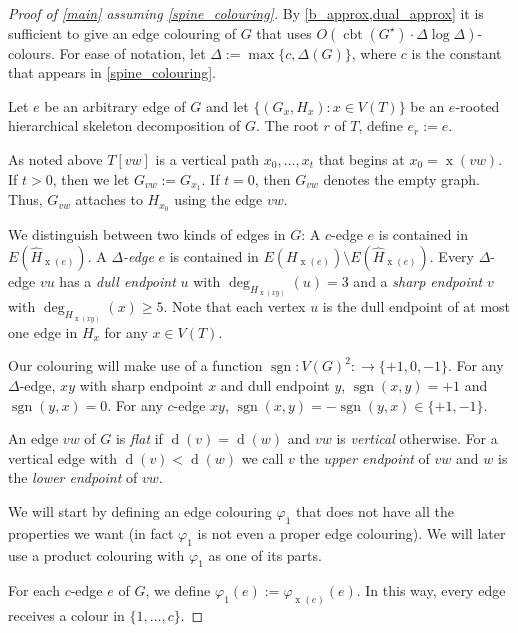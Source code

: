 \documentclass[kpfonts]{patmorin}
\DeclareMathOperator{\x}{x}
\DeclareMathOperator{\depth}{d}
\DeclareMathOperator{\cbt}{cbt}
\DeclareMathOperator{\sgn}{sgn}
\begin{document}
\begin{proof}[Proof of \cref{main} assuming \cref{spine_colouring}]
    By \cref{b_approx,dual_approx} it is sufficient to give an edge colouring of $G$ that uses $O(\cbt(G^\star)\cdot\Delta\log\Delta)$-colours.  For ease of notation, let $\Delta:=\max\{c,\Delta(G)\}$, where $c$ is the constant that appears in \cref{spine_colouring}.

    Let $e$ be an arbitrary edge of $G$ and let
    $\{(G_x,H_x): x\in V(T)\}$ be an $e$-rooted hierarchical skeleton decomposition of $G$.  The root $r$ of $T$, define $e_r:=e$.


    As noted above $T[vw]$ is a vertical path $x_0,\ldots,x_t$ that begins at $x_0=\x(vw)$.  If $t>0$, then we let $G_{vw}:=G_{x_1}$.  If $t=0$, then $G_{vw}$ denotes the empty graph.  Thus, $G_{vw}$ attaches to $H_{x_0}$ using the edge $vw$.

    We distinguish between two kinds of edges in $G$: A $c$-edge $e$ is contained in $E(\hat{H}_{\x(e)})$.  A \emph{$\Delta$-edge} $e$ is contained in $E(H_{\x(e)})\setminus E(\hat{H}_{\x(e)})$.  Every $\Delta$-edge $vu$ has a \emph{dull endpoint} $u$ with $\deg_{H_{\x(xy)}}(u)=3$ and a \emph{sharp endpoint} $v$ with $\deg_{H_{\x(xy)}}(x)\ge 5$.  Note that each vertex $u$ is the dull endpoint of at most one edge in $H_x$ for any $x\in V(T)$.

    Our colouring will make use of a function $\sgn:V(G)^2:\to\{+1,0,-1\}$.  For any $\Delta$-edge, $xy$ with sharp endpoint $x$ and dull endpoint $y$, $\sgn(x,y)={+1}$ and $\sgn(y,x)=0$.  For any $c$-edge $xy$, $\sgn(x,y)=-\sgn(y,x)\in\{{+1},{-1}\}$.

    An edge $vw$ of $G$ is \emph{flat} if $\depth(v)=\depth(w)$ and $vw$ is \emph{vertical} otherwise. For a vertical edge with $\depth(v)<\depth(w)$ we call $v$ the \emph{upper endpoint} of $vw$ and $w$ is the \emph{lower endpoint} of $vw$.

    We will start by defining an edge colouring $\varphi_1$ that does not have all the properties we want (in fact $\varphi_1$ is not even a proper edge colouring).  We will later use a product colouring with $\varphi_1$ as one of its parts.

    For each $c$-edge $e$ of $G$, we define $\varphi_1(e):=\varphi_{\x(e)}(e)$. In this way, every edge receives a colour in $\{1,\ldots,c\}$.


\end{proof}
\end{document}
